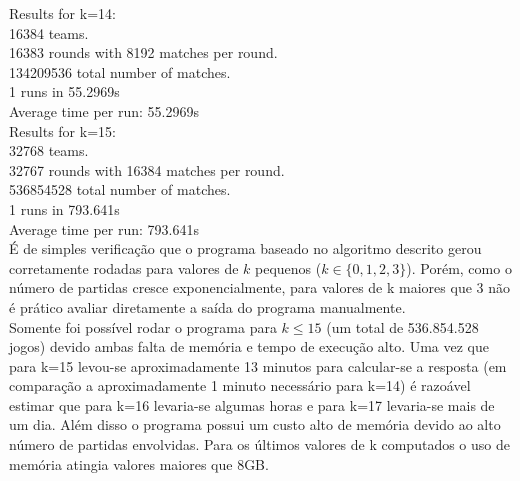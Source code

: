 \documentclass[twoside]{article}
\begin{document}
\begin{multicols}{2}
{\color[rgb]{0,0,1}Results for k=14:}\\
\hspace*{5mm}16384 teams.\\
\hspace*{5mm}16383 rounds with 8192 matches per round.\\
\hspace*{5mm}134209536 total number of matches.\\
\hspace*{5mm}1 runs in 55.2969s\\
\hspace*{5mm}Average time per run: {\color[rgb]{0.7,0.3,0}55.2969s}\\

{\color[rgb]{0,0,1}Results for k=15:}\\
\hspace*{5mm}32768 teams.\\
\hspace*{5mm}32767 rounds with 16384 matches per round.\\
\hspace*{5mm}536854528 total number of matches.\\
\hspace*{5mm}1 runs in 793.641s\\
\hspace*{5mm}Average time per run: {\color[rgb]{0.7,0.3,0}793.641s}\\

É de simples verificação que o programa baseado no algoritmo descrito gerou corretamente rodadas para valores de $k$ pequenos ($k \in \{0,1,2,3\}$). Porém, como o número de partidas cresce exponencialmente, para valores de k maiores que 3 não é prático avaliar diretamente a saída do programa manualmente.\\

Somente foi possível rodar o programa para $k \leq 15$ (um total de 536.854.528 jogos) devido ambas falta de memória e tempo de execução alto. Uma vez que para k=15 levou-se aproximadamente 13 minutos para calcular-se a resposta (em comparação a aproximadamente 1 minuto necessário para k=14) é razoável estimar que para k=16 levaria-se algumas horas e para k=17 levaria-se mais de um dia. Além disso o programa possui um custo alto de memória devido ao alto número de partidas envolvidas. Para os últimos valores de k computados o uso de memória atingia valores maiores que 8GB.\\


\newpage

\end{multicols}
\end{document}
